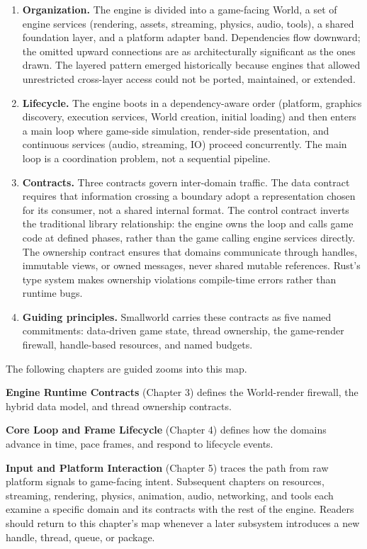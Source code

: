 \documentclass[
  11pt,
  letterpaper,
  DIV=11,
  numbers=noendperiod,
  twoside,
  open=right]{scrreprt}
\begin{document}
\begin{enumerate}
\def\labelenumi{\arabic{enumi}.}
\item
  \textbf{Organization.} The engine is divided into a game-facing World,
  a set of engine services (rendering, assets, streaming, physics,
  audio, tools), a shared foundation layer, and a platform adapter band.
  Dependencies flow downward; the omitted upward connections are as
  architecturally significant as the ones drawn. The layered pattern
  emerged historically because engines that allowed unrestricted
  cross-layer access could not be ported, maintained, or extended.
\item
  \textbf{Lifecycle.} The engine boots in a dependency-aware order
  (platform, graphics discovery, execution services, World creation,
  initial loading) and then enters a main loop where game-side
  simulation, render-side presentation, and continuous services (audio,
  streaming, IO) proceed concurrently. The main loop is a coordination
  problem, not a sequential pipeline.
\item
  \textbf{Contracts.} Three contracts govern inter-domain traffic. The
  data contract requires that information crossing a boundary adopt a
  representation chosen for its consumer, not a shared internal format.
  The control contract inverts the traditional library relationship: the
  engine owns the loop and calls game code at defined phases, rather
  than the game calling engine services directly. The ownership contract
  ensures that domains communicate through handles, immutable views, or
  owned messages, never shared mutable references. Rust's type system
  makes ownership violations compile-time errors rather than runtime
  bugs.
\item
  \textbf{Guiding principles.} Smallworld carries these contracts as
  five named commitments: data-driven game state, thread ownership, the
  game-render firewall, handle-based resources, and named budgets.
\end{enumerate}

The following chapters are guided zooms into this map.

\textbf{Engine Runtime Contracts} (Chapter 3) defines the World-render
firewall, the hybrid data model, and thread ownership contracts.

\textbf{Core Loop and Frame Lifecycle} (Chapter 4) defines how the
domains advance in time, pace frames, and respond to lifecycle events.

\textbf{Input and Platform Interaction} (Chapter 5) traces the path from
raw platform signals to game-facing intent. Subsequent chapters on
resources, streaming, rendering, physics, animation, audio, networking,
and tools each examine a specific domain and its contracts with the rest
of the engine. Readers should return to this chapter's map whenever a
later subsystem introduces a new handle, thread, queue, or package.
\end{document}
